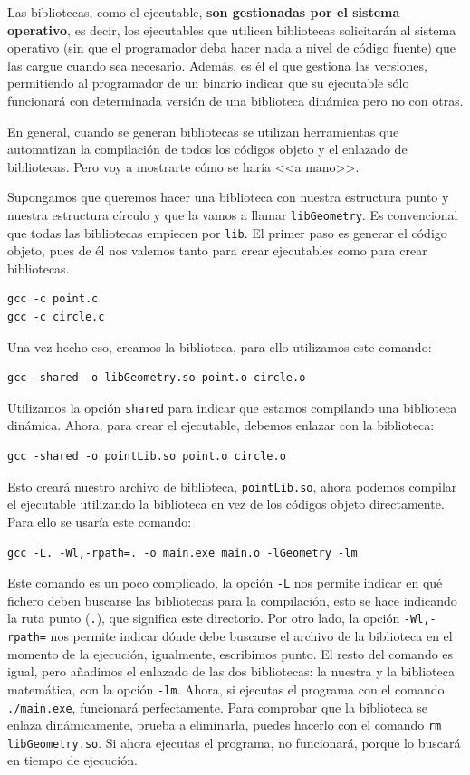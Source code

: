 \documentclass[a4paper]{article}
\begin{document}
Las bibliotecas, como el ejecutable, \textbf{son gestionadas por el sistema
operativo}, es decir, los ejecutables que utilicen bibliotecas solicitarán al
sistema operativo (sin que el programador deba hacer nada a nivel de código
fuente) que las cargue cuando sea necesario. Además, es él el que gestiona
las versiones, permitiendo al programador de un binario indicar que su
ejecutable sólo funcionará con determinada versión de una biblioteca dinámica
pero no con otras.

En general, cuando se generan bibliotecas se utilizan herramientas que
automatizan la compilación de todos los códigos objeto y el enlazado de
bibliotecas. Pero voy a mostrarte cómo se haría <<a mano>>.

Supongamos que queremos hacer una biblioteca con nuestra estructura punto y
nuestra estructura círculo y que la vamos a llamar \verb!libGeometry!.
Es convencional que todas las bibliotecas empiecen por \verb!lib!.
El primer paso es generar el código objeto,
pues de él nos valemos tanto para crear ejecutables como para crear bibliotecas.
\begin{verbatim}
gcc -c point.c
gcc -c circle.c
\end{verbatim}

Una vez hecho eso, creamos la biblioteca, para ello utilizamos este comando:
\begin{verbatim}
gcc -shared -o libGeometry.so point.o circle.o
\end{verbatim}

Utilizamos la opción \verb!shared! para indicar que estamos compilando
una biblioteca dinámica. Ahora, para crear el ejecutable, debemos enlazar con
la biblioteca:

\begin{verbatim}
gcc -shared -o pointLib.so point.o circle.o
\end{verbatim}

Esto creará nuestro archivo de biblioteca, \verb!pointLib.so!, ahora podemos
compilar el ejecutable utilizando la biblioteca en vez de los códigos objeto
directamente. Para ello se usaría este comando:

\begin{verbatim}
gcc -L. -Wl,-rpath=. -o main.exe main.o -lGeometry -lm
\end{verbatim}

Este comando es un poco complicado, la opción \verb!-L! nos permite indicar
en qué fichero deben buscarse las bibliotecas para la compilación, esto se hace
indicando la ruta punto (\verb!.!), que significa este directorio. Por otro
lado, la opción \verb!-Wl,-rpath=! nos permite indicar dónde debe buscarse
el archivo de la biblioteca en el momento de la ejecución,
igualmente, escribimos punto. El resto del
comando es igual, pero añadimos el enlazado de las dos bibliotecas: la nuestra y
la biblioteca matemática, con la opción \verb!-lm!. Ahora, si ejecutas el
programa con el comando \verb!./main.exe!, funcionará perfectamente.
Para comprobar que la biblioteca se enlaza dinámicamente, prueba a eliminarla,
puedes hacerlo con el comando \verb!rm libGeometry.so!. Si ahora ejecutas el
programa, no funcionará, porque lo buscará en tiempo de ejecución.
\end{document}
